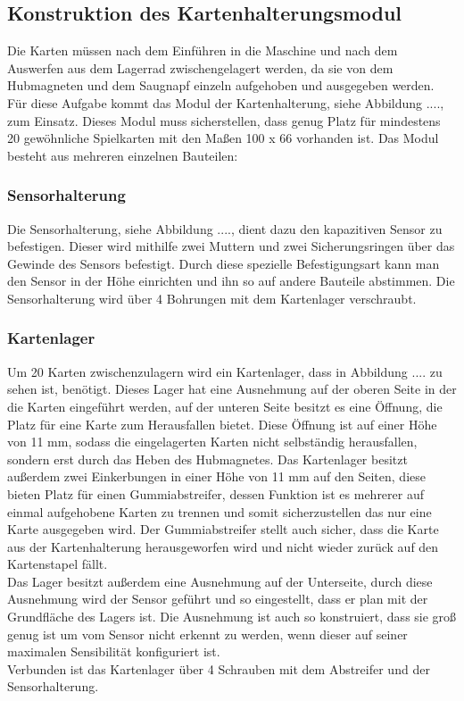 \subsection{Konstruktion des Kartenhalterungsmodul}
Die Karten müssen nach dem Einführen in die Maschine und nach dem Auswerfen aus dem Lagerrad zwischengelagert werden, da sie
von dem Hubmagneten und dem Saugnapf einzeln aufgehoben und ausgegeben werden. Für diese Aufgabe kommt das Modul der
Kartenhalterung, siehe Abbildung ...., zum Einsatz. Dieses Modul muss sicherstellen, dass genug Platz für mindestens 20 gewöhnliche Spielkarten  mit den Maßen 100 x 66
vorhanden ist. Das Modul besteht aus mehreren einzelnen Bauteilen:

\subsubsection{Sensorhalterung}
Die Sensorhalterung, siehe Abbildung ...., dient dazu den kapazitiven Sensor zu befestigen. Dieser wird mithilfe zwei Muttern und zwei Sicherungsringen
über das Gewinde des Sensors befestigt. Durch diese spezielle Befestigungsart kann man den Sensor in der Höhe einrichten und ihn so
auf andere Bauteile abstimmen. Die Sensorhalterung wird über 4 Bohrungen mit dem Kartenlager verschraubt.

\subsubsection{Kartenlager}

Um 20 Karten zwischenzulagern wird ein Kartenlager, dass in Abbildung .... zu sehen ist, benötigt. Dieses Lager hat eine Ausnehmung auf der oberen Seite in der die Karten
eingeführt werden, auf der unteren Seite besitzt es eine Öffnung, die Platz für eine Karte zum Herausfallen bietet. Diese Öffnung ist auf
einer Höhe von 11 mm, sodass die eingelagerten Karten nicht selbständig  herausfallen, sondern erst durch das Heben des Hubmagnetes.
Das Kartenlager besitzt außerdem zwei Einkerbungen in einer Höhe von 11 mm auf den Seiten, diese bieten Platz für einen Gummiabstreifer,
dessen Funktion ist es mehrerer auf einmal aufgehobene Karten zu trennen und somit sicherzustellen das nur eine Karte ausgegeben wird.
Der Gummiabstreifer stellt auch sicher, dass die Karte aus der Kartenhalterung herausgeworfen wird und nicht wieder zurück auf den Kartenstapel
fällt. \\
Das Lager besitzt außerdem eine Ausnehmung auf der Unterseite, durch diese Ausnehmung wird der Sensor geführt und so eingestellt,
dass er plan mit der Grundfläche des Lagers ist. Die Ausnehmung ist auch so konstruiert, dass sie groß genug ist um vom Sensor
nicht erkennt zu werden, wenn dieser auf seiner maximalen Sensibilität konfiguriert ist.\\
Verbunden ist das Kartenlager über 4 Schrauben mit dem Abstreifer und der Sensorhalterung.

